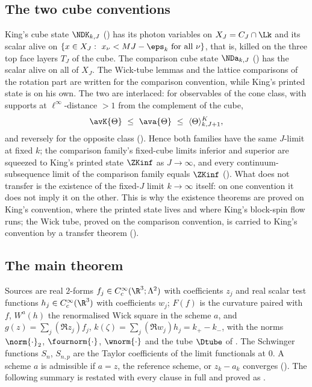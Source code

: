 \subsection{The two cube conventions}

King's cube state $\NDK_{k,J}$ () has its photon variables on $X_J=C_J\cap\Lk$ and its
scalar alive on $\{x\in X_J:\ x_\nu<MJ-\eps_k\ \text{for all }\nu\}$, that is, killed on the three top
face layers $T_J$ of the cube. The comparison cube state $\NDa_{k,J}$ () has the
scalar alive on all of $X_J$. The Wick-tube lemmas and the lattice comparisons of the rotation part are
written for the comparison convention, while King's printed state is on his own. The two are interlaced:
for observables of the cone class, with supports at $\ell^\infty$-distance $>1$ from the complement of the
cube,
\[
\avK{\Theta}\ \le\ \ava{\Theta}\ \le\ \langle\Theta\rangle^{K}_{k,J+1},
\]
and reversely for the opposite class (). Hence both families have the same $J$-limit at
fixed $k$; the comparison family's fixed-cube limits inferior and superior are squeezed to King's printed
state $\ZKinf$ as $J\to\infty$, and every continuum-subsequence limit of the comparison family equals
$\ZKinf$ (). What does not transfer is the existence of the fixed-$J$ limit $k\to\infty$
itself: on one convention it does not imply it on the other. This is why the existence theorems are proved
on King's convention, where the printed state lives and where King's block-spin flow runs; the Wick tube,
proved on the comparison convention, is carried to King's convention by a transfer theorem
().

\subsection{The main theorem}

Sources are real $2$-forms $f_j\in C^\infty_c(\R^3;\Lambda^2)$ with coefficients $z_j$ and real scalar test
functions $h_j\in C^\infty_c(\R^3)$ with coefficients $w_j$; $F(f)$ is the curvature paired with $f$,
$W^a(h)$ the renormalised Wick square in the scheme $a$, and $g(z)=\sum_j(\Re z_j)f_j$,
$k(\zeta)=\sum_j(\Re w_j)h_j=k_+-k_-$, with the norms $\norm{\cdot}_2$, $\fournorm{\cdot}$,
$\wnorm{\cdot}$ and the tube $\Dtube$ of . The Schwinger functions
$S_n$, $S_{n,p}$ are the Taylor coefficients of the limit functionals at $0$. A scheme $a$ is admissible
if $a=z$, the reference scheme, or $z_k-a_k$ converges (). The following summary is
restated with every clause in full and proved as .

